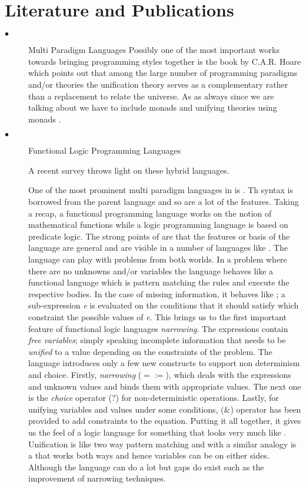 \documentclass[thesis-solanki.tex]{subfiles}
\begin{document}
\section{Literature and Publications}
\begin{description}
\item[$\bullet$] Multi Paradigm Languages
  Possibly one of the most important works towards bringing programming styles together is the book by C.A.R.
  Hoare \cite{hoare1998unifying} which points out that among the large number of programming paradigms and/or
  theories the unification theory serves as a complementary rather than a replacement to relate the universe.
  As as always since we are talking about  we have to include monads and unifying theories using
  monads \cite{gibbons2013unifying}.
 

\item[$\bullet$] Functional Logic Programming Languages

A recent survey \cite{hanus2007multi} throws light on these hybrid languages. 

One of the most prominent multi paradigm languages in  is 
\cite{antoy2010functional}.
Th syntax is borrowed from the parent language and so are a lot of the features.
Taking a recap, a functional programming language works on the notion of mathematical functions while a logic
programming language is based on predicate logic.
The strong points of  are that the features or basis of the language are general and are visible in
a number of languages like \cite{website:toy}.
The language can play with problems from both worlds.
In a problem where there are no unknowns and/or variables the language behaves like a functional language which is
pattern matching the rules and execute the respective bodies.
In the case of missing information, it behaves like ; a sub-expression \textit{e} is evaluated on
the conditions that it should satisfy which constraint the possible values of \textit{e}.
This brings us to the first important feature of functional logic languages \textit{narrowing}.
The expressions contain \textit{free variables}; simply speaking incomplete information that needs to be
\textit{unified} to a value depending on the constraints of the problem.
The language introduces only a few new constructs to support non determinism and choice.
Firstly, \textit{narrowing} ($\mathtt{=:=}$), which deals with the expressions and unknown values and binds them
with appropriate values.
The next one is the \textit{choice} operator ($\mathtt{?}$) for non-deterministic operations.
Lastly, for unifying variables and values under some conditions, ($\mathtt{\&}$) operator has been provided to add
constraints to the equation.
Putting it all together, it gives us the feel of a logic language for something that looks very much like
.
Unification is like two way pattern matching and with a similar analogy  is a 
that works both ways and hence variables can be on either sides.
Although the language can do a lot but gaps do exist such as the improvement of narrowing techniques.
 
 
\end{description}
\end{document}
